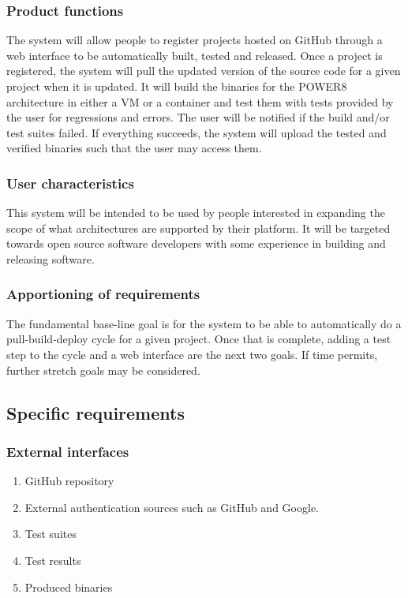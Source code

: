 \documentclass[10pt,letterpaper,onecolumn,draftclsnofoot]{IEEEtran}
\begin{document}
\subsubsection{Product functions}
The system will allow people to register projects hosted on GitHub through a web interface to be automatically built, tested and released. Once a project is registered, the system will pull the updated version of the source code for a given project when it is updated. It will build the binaries for the POWER8 architecture in either a VM or a container and test them with tests provided by the user for regressions and errors. The user will be notified if the build and/or test suites failed. If everything succeeds, the system will upload the tested and verified binaries such that the user may access them.
\subsubsection{User characteristics}
This system will be intended to be used by people interested in expanding the scope of what architectures are supported by their platform. It will be targeted towards open source software developers with some experience in building and releasing software.
\subsubsection{Apportioning of requirements}
The fundamental base-line goal is for the system to be able to automatically do a pull-build-deploy cycle for a given project. Once that is complete, adding a test step to the cycle and a web interface are the next two goals. If time permits, further stretch goals may be considered.

\subsection{Specific requirements}
\subsubsection{External interfaces}
\begin{enumerate}
\item GitHub repository
\item External authentication sources such as GitHub and Google.
\item Test suites
\item Test results
\item Produced binaries
\end{enumerate}
\end{document}
